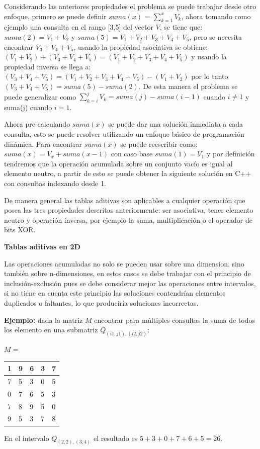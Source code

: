 \documentclass[12pt, a4paper]{article}
\newcommand\cppfile[2][]{

}
\newcommand{\subtitulo}[1]{\begin{center}\textbf{#1}\end{center}}
\begin{document}
	Considerando las anteriores propiedades el problema se puede trabajar desde otro enfoque, primero se puede
	definir $suma(x)$ = $\sum_{k=1}^{x} V_{k}$, ahora tomando como ejemplo una consulta en el rango [3,5] 
	del vector $V$, se tiene que: $suma(2) = V_{1}+V_{2}$ y $suma(5) = V_{1}+V_{2}+V_{3}+V_{4}+V_{5}$,
	pero se necesita encontrar $V_{3}+V_{4}+V_{5}$, usando la propiedad asociativa se obtiene: 
	$(V_{1}+V_{2})+(V_{3}+V_{4}+V_{5})=(V_{1}+V_{2}+V_{3}+V_{4}+V_{5})$ y usando la propiedad inversa se llega a:
	$(V_{3}+V_{4}+V_{5})=(V_{1}+V_{2}+V_{3}+V_{4}+V_{5})-(V_{1}+V_{2})$ por lo tanto 
	$(V_{3}+V_{4}+V_{5})=suma(5)-suma(2)$. De esta manera el problema se puede generalizar como 
	$\sum_{k=i}^{j} V_{k} = suma(j) - suma(i-1)$ cuando $i \neq 1$ y suma(j) cuando $i=1$.
	
	Ahora pre-calculando $suma(x)$ se puede dar una solución inmediata a cada consulta, esto se puede resolver 
	utilizando un enfoque básico de programación dinámica. Para encontrar $suma(x)$ se puede reescribir como: 
	$suma(x) = V_{x} + suma(x-1)$ con caso base $suma(1)=V_{1}$ y por definición tendremos que la operación acumulada
	sobre un conjunto vacío es igual al elemento neutro, a partir de esto se puede obtener la siguiente solución en 
	C++ con consultas indexando desde 1.
	\cppfile[6-14]{codigos/tablas_aditivas.cpp}
	
	De manera general las tablas aditivas son aplicables a cualquier operación que posea las tres propiedades 
	descritas anteriormente: ser asociativa, tener elemento neutro y operación inversa, por ejemplo la suma,
	multiplicación o el operador de bits XOR.

	\subtitulo{Tablas aditivas en 2D}
	Las operaciones acumuladas no solo se pueden usar sobre una dimension, sino también sobre n-dimensiones, en estos
	casos se debe trabajar con el principio de inclusión-exclusión pues se debe considerar mejor las operaciones entre
	intervalos, si no tiene en cuenta este principio las soluciones contendrían elementos duplicados o faltantes, lo 
	que produciría soluciones incorrectas.
	
	\textbf{Ejemplo:} dada la matriz $M$ encontrar para múltiples consultas la suma de todos los elemento en una
	submatriz $Q_{(i1,j1),(i2,j2)}$:
	\begin{center}
		$M = $
		\begin{tabular}{|l|l|l|l|l|}
			\hline
			1  &9  &6 &3 &7\\ \hline
			7  &5  &3 &0 &5\\ \hline
			0  &7  &6 &5 &3\\ \hline
			7  &8  &9 &5 &0\\ \hline
			9  &5  &3 &7 &8\\ \hline
		\end{tabular}
	\end{center}
	En el intervalo $Q_{(2,2),(3,4)}$ el resultado es $5+3+0+7+6+5=26$.
\end{document}
